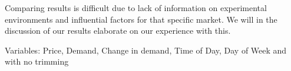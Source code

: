 Comparing results is difficult due to lack of information on experimental environments and influential factors for that specific market. We will in the discussion of our results elaborate on our experience with this. 

\noindent Variables: Price, Demand, Change in demand, Time of Day, Day of Week and with no trimming
\begin{table}[H]
\centering  %
\caption{Scatter text~\cite{singhal2011electricity} with other calculated inputs and no trim} %
\label{table:scatter_text_no_trim} %
\end{table}


